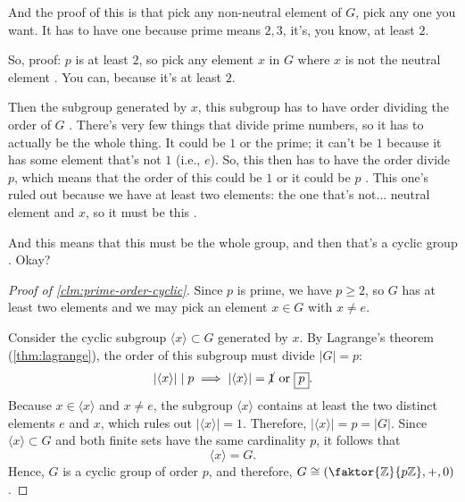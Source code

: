 \begin{proofWrapper}

\begin{speech}[00:19:36 - 00:20:59]
And the proof of this is that pick any non-neutral element of $G$, pick any one you want. It has to have one because prime means $2, 3$, it's, you know, at least $2$.

So, proof: $p$ is at least $2$, so pick any element $x$ in $G$ where $x$ is not the neutral element . You can, because it's at least $2$.

Then the subgroup generated by $x$, this subgroup has to have order dividing the order of $G$ . There's very few things that divide prime numbers, so it has to actually be the whole thing. It could be $1$ or the prime; it can't be $1$ because it has some element that's not $1$ (i.e., $e$). So, this then has to have the order divide $p$, which means that the order of this could be $1$ or it could be $p$ . This one's ruled out because we have at least two elements: the one that's not... neutral element and $x$, so it must be this .

And this means that this must be the whole group, and then that's a cyclic group . Okay?
\end{speech}

\begin{content}
\begin{proof}[Proof of \cref{clm:prime-order-cyclic}]
Since $p$ is prime, we have $p \ge 2$, so $G$ has at least two elements and we may pick an element $x \in G$ with $x \neq e$.

Consider the cyclic subgroup $\langle x \rangle \subset G$ generated by $x$. By Lagrange's theorem (\cref{thm:lagrange}), the order of this subgroup must divide $|G| = p$:
\[
|\langle x \rangle| \mid p \implies |\langle x \rangle| = \cancel{1} \text{ or } \boxed{p}.
\]
Because $x \in \langle x \rangle$ and $x \neq e$, the subgroup $\langle x \rangle$ contains at least the two distinct elements $e$ and $x$, which rules out $|\langle x \rangle| = 1$. Therefore, $|\langle x \rangle| = p = |G|$. Since $\langle x \rangle \subset G$ and both finite sets have the same cardinality $p$, it follows that
\[
\langle x \rangle = G.
\]
Hence, $G$ is a cyclic group of order $p$, and therefore, $G \cong \left(\faktor{\mathbb{Z}}{p\mathbb{Z}}, +, 0\right)$.
\end{proof}


\end{content}
\end{proofWrapper}
